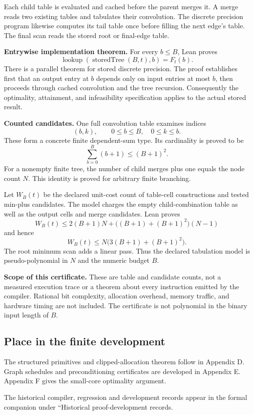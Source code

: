 Each child table is evaluated and cached before the parent merges it. A merge reads two existing tables and tabulates their convolution. The discrete precision program likewise computes its tail table once before filling the next edge's table. The final scan reads the stored root or final-edge table.

\textbf{Entrywise implementation theorem.} For every $b\leq B$, Lean proves
\[
\operatorname{lookup}(\operatorname{storedTree}(B,t),b)=F_t(b).
\]
There is a parallel theorem for stored discrete precision. The proof establishes first that an output entry at $b$ depends only on input entries at most $b$, then proceeds through cached convolution and the tree recursion. Consequently the optimality, attainment, and infeasibility specification applies to the actual stored result.

\textbf{Counted candidates.} One full convolution table examines indices
\[
(b,k),\qquad 0\leq b\leq B,\quad0\leq k\leq b.
\]
These form a concrete finite dependent-sum type. Its cardinality is proved to be
\[
\sum_{b=0}^B(b+1)\leq(B+1)^2.
\]
For a nonempty finite tree, the number of child merges plus one equals the node count $N$. This identity is proved for arbitrary finite branching.

Let $W_B(t)$ be the declared unit-cost count of table-cell constructions and tested min-plus candidates. The model charges the empty child-combination table as well as the output cells and merge candidates. Lean proves
\[
W_B(t)\leq2(B+1)N+\bigl((B+1)+(B+1)^2\bigr)(N-1)
\]
and hence
\[
\boxed{W_B(t)\leq N\bigl(3(B+1)+(B+1)^2\bigr).}
\]
The root minimum scan adds a linear pass. Thus the declared tabulation model is pseudo-polynomial in $N$ and the numeric budget $B$.

\textbf{Scope of this certificate.} These are table and candidate counts, not a measured execution trace or a theorem about every instruction emitted by the compiler. Rational bit complexity, allocation overhead, memory traffic, and hardware timing are not included. The certificate is not polynomial in the binary input length of $B$.



\subsection{Place in the finite development}\label{supp3:subsection:007}
The structured primitives and clipped-allocation theorem follow in Appendix D. Graph schedules and preconditioning certificates are developed in Appendix E. Appendix F gives the small-core optimality argument.

The historical compiler, regression and development records appear in the formal companion under ``Historical proof-development records.
